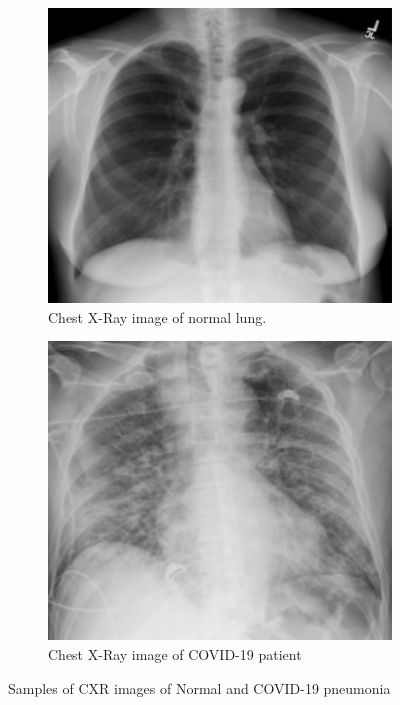 \begin{figure}%
    \centering
    \begin{subfigure}[b]{0.4\textwidth}
        \centering
        \includegraphics[width=\textwidth]{Figures/introNormCXR.png}
        \caption{Chest X-Ray image of normal lung.}
        \label{NorCXR}
    \end{subfigure}
     \begin{subfigure}[b]{0.4\textwidth}
         \centering
         \includegraphics[width=\textwidth]{Figures/intoCovidCXR.png}
         \caption{Chest X-Ray image of COVID-19 patient}
         \label{CovCXR}
     \end{subfigure}
    \caption{Samples of CXR images of Normal and COVID-19 pneumonia}%
    \label{NorCovCXR}%
\end{figure}

